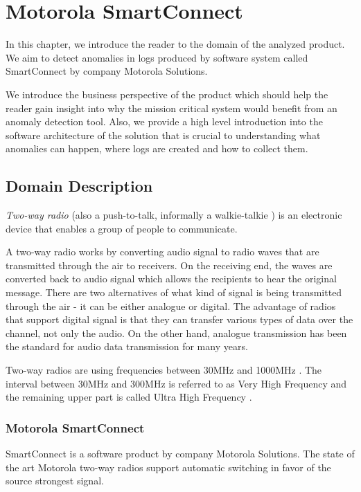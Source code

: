 \chapter{Motorola SmartConnect}
\label{smart-connect}
In this chapter, we introduce the reader to the domain of the analyzed product.
We aim to detect anomalies in logs produced by software system called SmartConnect by company Motorola Solutions.

We introduce the business perspective of the product which should help the reader gain insight into why the mission critical system would benefit from an anomaly detection tool.
Also, we provide a high level introduction into the software architecture of the solution that is crucial to understanding what anomalies can happen, where logs are created and how to collect them.

\section{Domain Description}

\textit{Two-way radio} (also a push-to-talk, informally a walkie-talkie  \cite{twowayradio}) is an electronic device that enables a group of people to communicate.

A two-way radio works by converting audio signal to radio waves that are transmitted through the air to receivers. On the receiving end, the waves are converted back to audio signal which allows the recipients to hear the original message.
There are two alternatives of what kind of signal is being transmitted through the air - it can be either analogue or digital.
The advantage of radios that support digital signal is that they can transfer various types of data over the channel, not only the audio. On the other hand, analogue transmission has been the standard for audio data transmission for many years.

Two-way radios are using frequencies between 30MHz and 1000MHz \cite{twowayradio}. The interval between 30MHz and 300MHz is referred to as Very High Frequency and the remaining upper part is called Ultra High Frequency \cite{twowayradio}.


\subsection{Motorola SmartConnect}

SmartConnect is a software product by company Motorola Solutions. 
The state of the art Motorola two-way radios \cite{apxp25radio} support automatic switching in favor of the source strongest signal.

